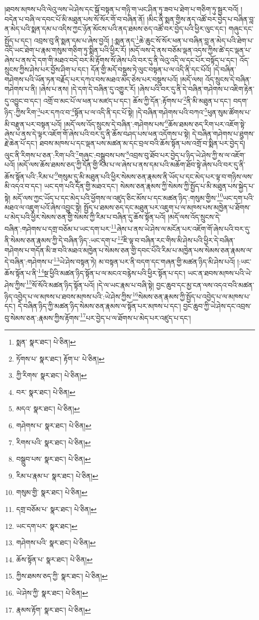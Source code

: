 །ཐབས་མཁས་པའི་ལེའུ་ལས་ཡེ་ཤེས་དང་སྒོ་བསྟན་པ་གཉི་ག་ཡང་ཤིན་ཏུ་ཟབ་པ་ཐེག་པ་གཅིག་ཏུ་སྦྱར་བའོ། །བདེན་པ་བཞི་ལ་དབང་པོ་མི་མཐུན་པས་སོ་སོར་གོ་བ་བཞིན་ནོ། །མིང་ནི་སྨན་གྱིས་ནད་འཚོ་བར་བྱེད་པ་བཞིན་བླ་ན་མེད་པའི་སྨན་དམ་པ་འདིས་ཀྱང་ཉོན་མོངས་པའི་ནད་ཐམས་ཅད་འཚོ་བར་བྱེད་པའི་ཕྱིར་ལུང་དང་། གཞུང་དང་སྤྱོད་པ་དང་། འབྲས་བུ་ནི་སྨན་དམ་པ་ཞེས་བྱའོ། །:སྨན་ནད་\footnote{སྨན་  སྣར་ཐང་།  པེ་ཅིན། }ཆེ་ཆུང་སོ་སོར་ཕན་པ་བཞིན་བླ་ན་མེད་པའི་ཐེག་པ་འདི་ཡང་ཐེག་པ་རྣམ་གསུམ་གཅིག་ཏུ་སྨིན་པའི་ཕྱིར་རོ། །མདོ་ལས་དེ་ནས་བཅོམ་ལྡན་འདས་ཀྱིས་ཚེ་དང་ལྡན་པ་ཞེས་པ་ནས་དེ་དག་གི་མཐའ་བདེ་བར་མི་རྟོགས་སོ་ཞེས་པའི་བར་དུ་ནི་ལེའུ་འདི་ལ་དང་པོར་བསྟོད་པ་དང་། འོད་སྲུངས་ཀྱིས་ཤེས་པར་བྱོས་ཤིག་པ་དང་། དོན་གྱི་མདོ་བསྡུས་ཏེ་ལུང་བསྟན་པ་ལ་འདི་ནི་དང་པོའོ། །དེ་བཞིན་གཤེགས་པའི་ཡོན་ཏན་བརྗོད་པར་དཀའ་བས་མཐའ་མེད་ཅེས་པར་བསྡུས་པའོ། །མདོ་ལས། འོད་སྲུངས་དེ་བཞིན་གཤེགས་པ་ནི། །ཞེས་པ་ནས། །དེ་དག་དེ་བཞིན་དུ་འགྱུར་རོ། །ཞེས་པའི་བར་དུ་ནི་དེ་བཞིན་གཤེགས་པ་འཇིག་རྟེན་དུ་འབྱུང་བ་དང་། འགྲོ་བ་མང་པོ་ལ་ཕན་པ་མཛད་པ་དང་། ཆོས་ཀྱི་དོན་:རྟོགས་པ་\footnote{ཏོགས་པ་  སྣར་ཐང་། རྟོག་པ་  པེ་ཅིན། }ནི་མི་མཐུན་པ་དང་། བདག་ཉིད་:ཀྱིས་རིག་\footnote{ཀྱི་རིགས་  སྣར་ཐང་།  པེ་ཅིན། }པར་དཀའ་བ་\footnote{བར་  སྣར་ཐང་།  པེ་ཅིན། }སྟོན་པ་ལ་འདི་ནི་དང་པོ་སྟེ། །དེ་བཞིན་གཤེགས་པའི་བཀའ་\footnote{མདའ་  སྣར་ཐང་།  པེ་ཅིན། }ཕུན་སུམ་ཚོགས་པ་མི་བརྫུན་པར་བསྟན་པའོ། །མདོ་ལས་འོད་སྲུངས་དེ་བཞིན་:གཤེགས་པས་\footnote{གཤེགས་པ་  སྣར་ཐང་།  པེ་ཅིན། }ཆོས་ཐམས་ཅད་རིག་པར་འཇོག་སྟེ་ཞེས་པ་ནས་དེ་ལྟར་འཇོག་གོ་ཞེས་པའི་བར་དུ་ནི་ཆོས་བཤད་པས་ཕན་འདོགས་པ་སྟེ། དེ་བཞིན་གཤེགས་པ་ཐུགས་རྗེ་ཆེན་པོ་དང་། ཐབས་མཁས་པ་དང་ལྡན་པས་མཚན་མ་དང་བྲལ་བའི་ཆོས་སྟོན་པས་འགྲོ་བ་སྨིན་པར་བྱེད་དེ། ལུང་ནི་རིགས་པ་ཅན་:རིག་པའི་\footnote{རིགས་པའི་  སྣར་ཐང་།  པེ་ཅིན། }གཞུང་:བསྒྲུབས་པས་\footnote{བསྒྲུབ་པས་  སྣར་ཐང་།  པེ་ཅིན། }འབྲས་བུ་ཐོབ་པར་བྱེད་པ་ཉིད་ཡེ་ཤེས་ཀྱི་ས་ལ་འཇོག་པའོ། །མདོ་ལས་ཆོས་ཐམས་ཅད་ཀྱི་དོན་གྱི་རིམ་པ་ལ་ཞེས་པ་ནས་དམ་པའི་མཆོག་ཐོབ་སྟེ་ཞེས་པའི་བར་དུ་ནི་ཆོས་སྟོན་པའི་:རིམ་པ་\footnote{རིམ་པ་རྣམ་པ་  སྣར་ཐང་།  པེ་ཅིན། }གསུམ་དུ་མི་མཐུན་པའི་ཕྱིར་སེམས་ཅན་རྣམས་ནི་ཡོད་པ་དང་མེད་པར་ལྟ་བ་གཉིས་ལས་མི་འདའ་བ་དང་། ཡང་དག་པའི་དོན་གྱི་མཐའ་དང་། སེམས་ཅན་རྣམས་ཀྱི་སེམས་ཀྱི་སྤྱོད་པ་མི་མཐུན་པས་སྐྱེད་པ་སྟེ། མདོ་ལས་ཀྱང་ཡོད་པ་དང་མེད་པའི་ཕྱོགས་ལ་འཛུད་ཅིང་མོས་པ་དང་མཚན་ཉིད་:གསུམ་གྱིས་\footnote{གསུམ་གྱི་  སྣར་ཐང་།  པེ་ཅིན། }ཡང་དག་པའི་མཐའ་ལ་འཇུག་པའོ་ཞེས་འབྱུང་སྟེ། སྤྱོད་པ་ཐམས་ཅད་དང་མཐུན་པར་འཇུག་པ་ལ་མཁས་པས་མཁྱེན་པ་ཐོགས་པ་མེད་པའི་ཕྱིར་སེམས་ཅན་གྱི་སེམས་ཀྱི་རིམ་པ་བཞིན་དུ་ཆོས་སྟོན་པའོ། །མདོ་ལས་འོད་སྲུངས་དེ་བཞིན་:གཤེགས་པ་དགྲ་བཅོམ་པ་ཡང་དག་པར་\footnote{དགྲ་བཅོམ་པ་  སྣར་ཐང་།  པེ་ཅིན། }ཞེས་པ་ནས་ཡེ་ཤེས་ལ་མངོན་པར་འཇོག་གོ་ཞེས་པའི་བར་དུ་ནི་སེམས་ཅན་རྣམས་ཀྱི་དེ་བཞིན་ཉིད་:ཡང་དག་པ་\footnote{ཡང་དག་པར་  སྣར་ཐང་། }ཇི་ལྟ་བ་བཞིན་རང་གིས་མི་ཤེས་པའི་ཕྱིར་དེ་བཞིན་གཤེགས་པ་གདོན་མི་ཟ་བའི་མཐའ་མཁྱེན་པ་སེམས་ཅན་གྱི་དབང་པོའི་རིམ་པ་མཁྱེན་པས་སེམས་ཅན་རྣམས་ལ་དེ་བཞིན་:གཤེགས་པ་\footnote{གཤེགས་པའི་  སྣར་ཐང་།  པེ་ཅིན། }ཡེ་ཤེས་བསྟན་ཏེ། མ་བསྟན་པར་ནི་བདག་དང་གཞན་གྱི་མཚན་ཉིད་མི་ཤེས་པའོ། །:ཡང་ཆོས་སྟོན་པ་ནི་\footnote{ཆོས་སྟོན་པ་  སྣར་ཐང་།  པེ་ཅིན། }སྔ་ཕྱིའི་མཚན་ཉིད་སྟོན་པ་ལ་མངའ་བརྙེས་པའི་ཕྱིར་སྟོན་པ་དང་། ཡང་ན་ཐབས་མཁས་པའི་ཡེ་ཤེས་ཀྱིས་\footnote{ཀྱིས་ཐམས་ཅད་ཀྱི་  སྣར་ཐང་།  པེ་ཅིན། }སོ་སོའི་མཚན་ཉིད་སྟོན་པའོ། །དེ་ལ་ཡང་རྣམ་པ་བཞི་སྟེ། བྱང་ཆུབ་དང་མྱ་ངན་ལས་འདའ་བའི་མཚན་ཉིད་འབྱེད་པ་ལ་མཁས་པ་ཐབས་མཁས་པའི་:ཡེ་ཤེས་ཀྱིས་\footnote{ཡེ་ཤེས་ཀྱི་  སྣར་ཐང་།  པེ་ཅིན། }སེམས་ཅན་རྣམས་ཀྱི་སྤྱོད་པ་འབྱེད་པ་ལ་མཁས་པ་དང་། དེ་བཞིན་ཉིད་ཀྱི་མཚན་ཉིད་སེམས་ཅན་རྣམས་ལ་སྟོན་པར་མཁས་པ་དང་། བྱང་ཆུབ་ཀྱི་ཡེ་ཤེས་དང་འབྲས་བུ་སེམས་ཅན་:རྣམས་ཀྱིས་རྟོགས་\footnote{རྣམས་རྟོག་  སྣར་ཐང་།  པེ་ཅིན། }པར་བྱེད་པ་ལ་ཐོགས་པ་མེད་པར་འཛུད་པ་དང་། 